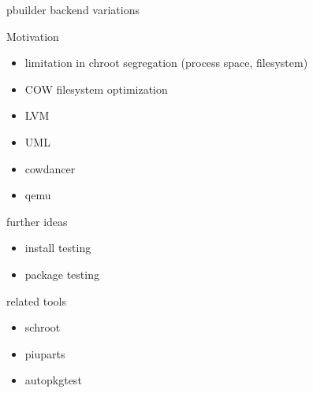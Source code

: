 \documentclass[dvipdfm,12pt,times]{beamer}
\begin{document}
\begin{frame}{pbuilder backend variations}
\begin{minipage}{0.5\hsize}
 Motivation
\begin{itemize}
 \item limitation in chroot segregation (process space, filesystem)
 \item COW filesystem optimization
\end{itemize}
\end{minipage}\begin{minipage}{0.4\hsize}
  \begin{itemize}
  \item LVM
  \item UML
  \item cowdancer
  \item qemu
 \end{itemize}
\end{minipage}
\end{frame}

\begin{frame}{further ideas}
 \begin{itemize}
  \item install testing
  \item package testing
 \end{itemize}
\end{frame}

\begin{frame}{related tools}
 \begin{itemize}
  \item schroot
  \item piuparts
  \item autopkgtest
 \end{itemize}
\end{frame}
\end{document}
